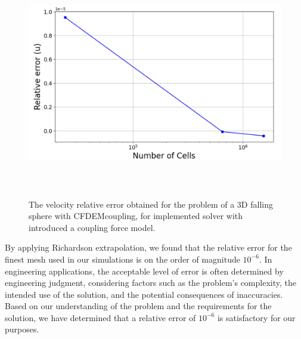 \begin{figure}[!ht]
    \centering
    \includegraphics[width=16cm, height = 10cm]{Images/chap3/richardson_extrapoltation.png}
    \caption{The velocity relative error obtained for the problem of a 3D falling sphere with CFDEMcoupling, for implemented solver with introduced a coupling force model.}
   \label{fig:l2}
\end{figure}

By applying Richardson extrapolation, we found that the relative error for the finest mesh used in our simulations is on the order of magnitude $10^{-6}$. In engineering applications, the acceptable level of error is often determined by engineering judgment, considering factors such as the problem's complexity, the intended use of the solution, and the potential consequences of inaccuracies. Based on our understanding of the problem and the requirements for the solution, we have determined that a relative error of $10^{-6}$ is satisfactory for our purposes.


